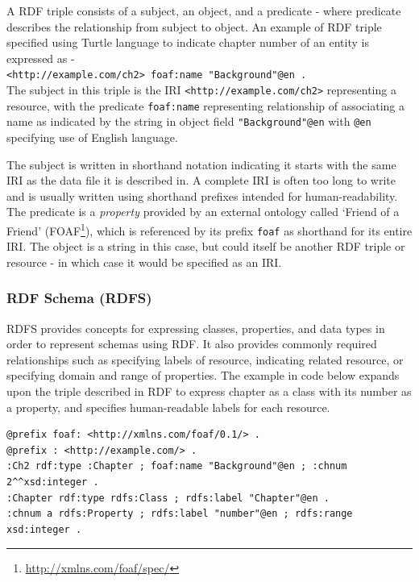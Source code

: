 A RDF triple consists of a subject, an object, and a predicate - where predicate describes the relationship from subject to object. An example of RDF triple specified using Turtle language to indicate chapter number of an entity is expressed as -\\ \-\hspace{5mm}\texttt{<http://example.com/ch2> foaf:name "Background"@en .}\\
The subject in this triple is the IRI \texttt{<http://example.com/ch2>} representing a resource, with the predicate \texttt{foaf:name} representing relationship of associating a name as indicated by the string in object field \texttt{"Background"@en} with \texttt{@en} specifying use of English language. 

The subject is written in shorthand notation indicating it starts with the same IRI as the data file it is described in. A complete IRI is often too long to write and is usually written using shorthand prefixes intended for human-readability.
The predicate is a \textit{property} provided by an external ontology called `Friend of a Friend' (FOAF\footnote{\url{http://xmlns.com/foaf/spec/}}), which is referenced by its prefix \texttt{foaf} as shorthand for its entire IRI.
The object is a string in this case, but could itself be another RDF triple or resource - in which case it would be specified as an IRI.

\subsubsection{RDF Schema (RDFS)}
RDFS provides concepts for expressing classes, properties, and data types in order to represent schemas using RDF. It also provides commonly required relationships such as specifying labels of resource, indicating related resource, or specifying domain and range of properties. The example in code below expands upon the triple described in RDF to express chapter as a class with its number as a property, and specifies human-readable labels for each resource.
\begin{verbatim}
@prefix foaf: <http://xmlns.com/foaf/0.1/> .
@prefix : <http://example.com/> .
:Ch2 rdf:type :Chapter ; foaf:name "Background"@en ; :chnum 2^^xsd:integer .
:Chapter rdf:type rdfs:Class ; rdfs:label "Chapter"@en .
:chnum a rdfs:Property ; rdfs:label "number"@en ; rdfs:range xsd:integer .
\end{verbatim}

